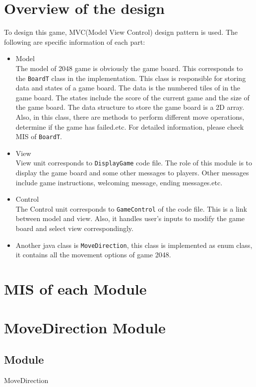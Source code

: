 \documentclass[12pt]{article}
\begin{document}
\section{Overview of the design}
To design this game, MVC(Model View Control) design pattern is used.
The following are specific information of each part:
\begin{itemize}
\item Model\\
The model of 2048 game is obviously the game board. This 
corresponds to the \verb|BoardT| class in the implementation. This 
class is responsible for storing  data and states of a game board.
The data is the numbered tiles of in the game board. The states 
include the score of the current game and the size of the game board.
The data structure to store the game board is a 2D array. Also, in this class, there are methods to perform different move
operations, determine if the game has failed.etc. For detailed 
information, please check MIS of \verb|BoardT|.
\item View\\
View unit corresponds to \verb|DisplayGame| code file. The role of 
this module is  to display the game board and some other messages to 
players. Other messages include game instructions, welcoming message,
ending messages.etc.
\item Control\\
The Control unit corresponds to \verb|GameControl| of the code file.
This is a link between model and view. Also, it handles user's inputs
to modify the game board and select view correspondingly. 
\item Another java class is \verb|MoveDirection|, this class is
implemented as enum class, it contains all the movement options of
game 2048.
\end{itemize}

\newpage

\section{MIS of each Module}

\section* {MoveDirection Module}
\subsection*{Module}
MoveDirection\\
\end{document}
